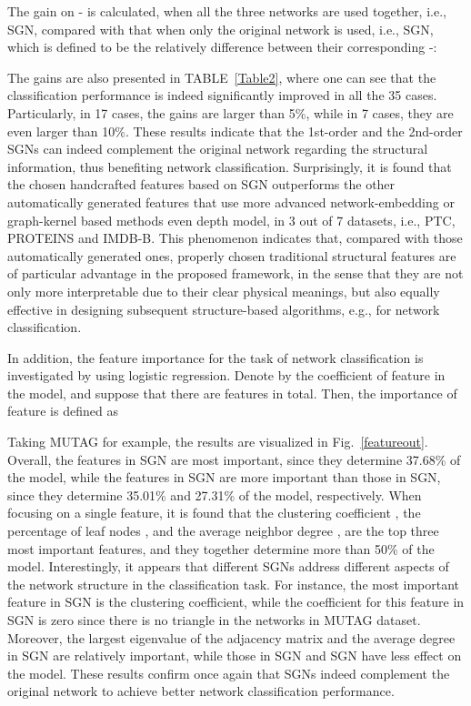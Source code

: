 \documentclass[10pt,journal,compsoc]{IEEEtran}
\begin{document}
The gain  on - is calculated, when all the three networks are used together, i.e., SGN, compared with that when only the original network is used, i.e., SGN, which is defined to be the relatively difference between their corresponding -:

The gains are also presented in TABLE~\ref{Table2}, where one can see that the classification performance is indeed significantly improved in all the 35 cases. Particularly, in 17 cases, the gains are larger than 5\%, while in 7 cases, they are even larger than 10\%. These results indicate that the 1st-order and the 2nd-order SGNs can indeed complement the original network regarding the structural information, thus benefiting network classification. Surprisingly, it is found that the chosen handcrafted features based on SGN outperforms the other automatically generated features that use more advanced network-embedding or graph-kernel based methods even depth model, in 3 out of 7 datasets, i.e., PTC, PROTEINS and IMDB-B. This phenomenon indicates that, compared with those automatically generated ones, properly chosen traditional structural features are of particular advantage in the proposed framework, in the sense that they are not only more interpretable due to their clear physical meanings, but also equally effective in designing subsequent structure-based algorithms, e.g., for network classification.

In addition, the feature importance for the task of network classification is investigated by using logistic regression. Denote by  the coefficient of feature  in the model, and suppose that there are  features in total. Then, the importance of feature  is defined as


Taking MUTAG for example, the results are visualized in Fig.~\ref{featureout}. Overall, the features in SGN are most important, since they determine 37.68\% of the model, while the features in SGN are more important than those in SGN, since they determine 35.01\% and 27.31\% of the model, respectively. When focusing on a single feature, it is found that the clustering coefficient , the percentage of leaf nodes , and the average neighbor degree , are the top three most important features, and they together determine more than 50\% of the model. Interestingly, it appears that different SGNs address different aspects of the network structure in the classification task. For instance, the most important feature in SGN is the clustering coefficient, while the coefficient for this feature in SGN is zero since there is no triangle in the networks in MUTAG dataset. Moreover, the largest eigenvalue of the adjacency matrix  and the average degree  in SGN are relatively important, while those in SGN and SGN have less effect on the model. These results confirm once again that SGNs indeed complement the original network to achieve better network classification performance.
\end{document}
